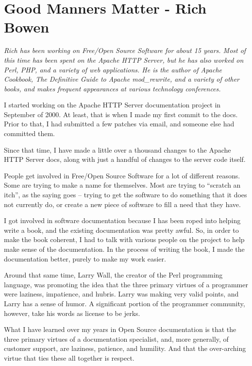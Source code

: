 \chapter{Good Manners Matter - Rich Bowen}

\textit{Rich has been working on Free/Open Source Software for about 15 years.
Most of this time has been spent on the Apache HTTP Server, but he has also
worked on Perl, PHP, and a variety of web applications. He is the author of
Apache Cookbook, The Definitive Guide to Apache mod\_rewrite, and a variety of
other books, and makes frequent appearances at various technology conferences.}

I started working on the Apache HTTP Server documentation project in September
of 2000. At least, that is when I made my first commit to the docs. Prior to
that, I had submitted a few patches via email, and someone else had committed
them.

Since that time, I have made a little over a thousand changes to the Apache HTTP
Server docs, along with just a handful of changes to the server code itself.

People get involved in Free/Open Source Software for a lot of different reasons.
Some are trying to make a name for themselves. Most are trying to ``scratch an
itch'', as the saying goes -- trying to get the software to do something that it
does not currently do, or create a new piece of software to fill a need that
they have.

I got involved in software documentation because I has been roped into helping
write a book, and the existing documentation was pretty awful. So, in order to
make the book coherent, I had to talk with various people on the project to help
make sense of the documentation. In the process of writing the book, I made the
documentation better, purely to make my work easier.

Around that same time, Larry Wall, the creator of the Perl programming language,
was promoting the idea that the three primary virtues of a programmer were
laziness, impatience, and hubris. Larry was making very valid points, and Larry
has a sense of humor. A significant portion of the programmer community,
however, take his words as license to be jerks.

What I have learned over my years in Open Source documentation is that the three
primary virtues of a documentation specialist, and, more generally, of customer
support, are laziness, patience, and humility. And that the over-arching virtue
that ties these all together is respect.

